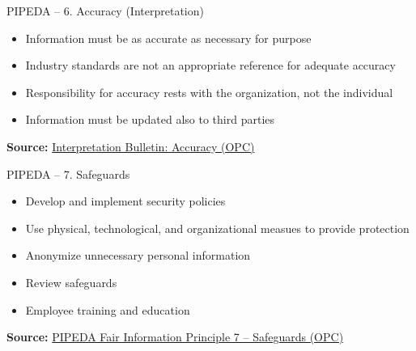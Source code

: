 \documentclass[ignorenonframetext,xcolor=x11names]{beamer}
\begin{document}
\begin{frame}[label=full]{PIPEDA -- 6. Accuracy \small (Interpretation)}
\begin{itemize}
   \item Information must be as accurate as necessary for purpose
   \item Industry standards are not an appropriate reference for adequate accuracy
   \item Responsibility for accuracy rests with the organization, not the individual
   \item Information must be updated also to third parties
\end{itemize}

\vspace{\baselineskip}
\scriptsize \textbf{Source:} \href{https://www.priv.gc.ca/en/privacy-topics/privacy-laws-in-canada/the-personal-information-protection-and-electronic-documents-act-pipeda/pipeda-compliance-help/pipeda-interpretation-bulletins/interpretations_04_accuracy/}{Interpretation Bulletin: Accuracy (OPC)}
\end{frame}

\begin{frame}[label=full]{PIPEDA -- 7. Safeguards}
\begin{itemize}
   \item Develop and implement security policies
   \item Use physical, technological, and organizational measues to provide protection
   \item Anonymize unnecessary personal information
   \item Review safeguards
   \item Employee training and education
\end{itemize}

\vspace{\baselineskip}
\scriptsize \textbf{Source:} \href{https://www.priv.gc.ca/en/privacy-topics/privacy-laws-in-canada/the-personal-information-protection-and-electronic-documents-act-pipeda/p_principle/principles/p_safeguards/}{PIPEDA Fair Information Principle 7 -- Safeguards (OPC)}
\end{frame}
\end{document}
